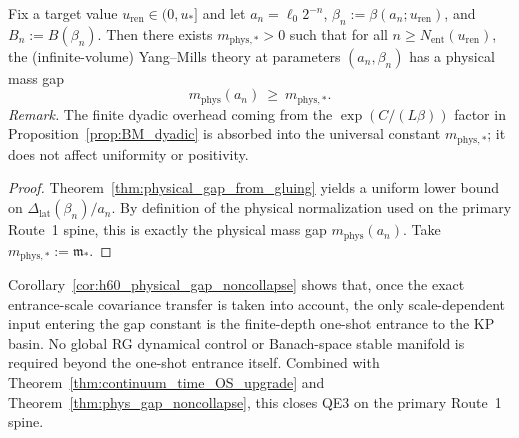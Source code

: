 \begin{corollary}
\label{cor:h60_physical_gap_noncollapse}
Fix a target value $u_{\mathrm{ren}}\in(0,u_\ast]$ and let $a_n=\ell_0 2^{-n}$, $\beta_n:=\beta(a_n;u_{\mathrm{ren}})$, and $B_n:=B(\beta_n)$.
Then there exists $m_{\mathrm{phys},\ast}>0$ such that for all $n\ge N_{\mathrm{ent}}(u_{\mathrm{ren}})$,
the (infinite-volume) Yang--Mills theory at parameters $(a_n,\beta_n)$ has a physical mass gap
\begin{equation}
\label{eq:h60_mphys_bound}
m_{\mathrm{phys}}(a_n)\ \ge\ m_{\mathrm{phys},\ast}.
\end{equation}
\noindent\emph{Remark.} The finite dyadic overhead coming from the $\exp(C/(L\beta))$ factor in Proposition~\ref{prop:BM_dyadic} is absorbed into the universal constant $m_{\mathrm{phys},\ast}$; it does not affect uniformity or positivity.

\end{corollary}

\begin{proof}
Theorem~\ref{thm:physical_gap_from_gluing} yields a uniform lower bound on $\Delta_{\mathrm{lat}}(\beta_n)/a_n$.
By definition of the physical normalization used on the primary Route~1 spine, this is exactly the physical mass gap $m_{\mathrm{phys}}(a_n)$.
Take $m_{\mathrm{phys},\ast}:=\mathfrak m_\ast$.
\end{proof}

\begin{remark}[Interpretation]
Corollary~\ref{cor:h60_physical_gap_noncollapse} shows that, once the exact entrance-scale covariance transfer is taken into account, the only scale-dependent input entering the gap constant is the finite-depth
one-shot entrance to the KP basin. No global RG dynamical control or Banach-space stable manifold is required beyond the one-shot entrance itself.
Combined with Theorem~\ref{thm:continuum_time_OS_upgrade} and Theorem~\ref{thm:phys_gap_noncollapse}, this closes QE3 on the primary Route~1 spine.
\end{remark}




